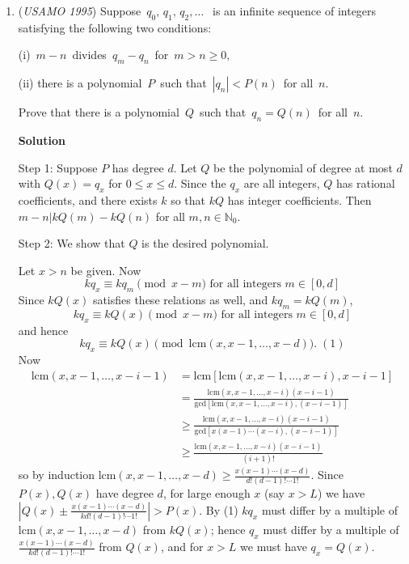 \begin{enumerate}
 $AA_1, BB_1, CC_1$ are medians, therefore $AA_2, BB_2, CC_2$ are symmedians, so the three symmedians meet at a point which is triangle center called the Lemoine point.

 \textbf{vladimir.shelomovskii@gmail.com, vvsss}

 


	\item (\textit{USAMO 1995}) Suppose $\, q_0, \, q_1, \,  q_2, \ldots \; \,$ is an infinite sequence of integers satisfying the following two conditions:

(i)  $\, m-n \,$ divides $\, q_m - q_n \,$ for $\, m > n \geq 0,$ 

(ii) there is a polynomial $\, P \,$ such that $\, |q_n| < P(n) \,$ for all $\, n$. 

Prove that there is a polynomial $\, Q \,$ such that $\, q_n = Q(n) \,$ for all $\, n$.


 



\textbf{Solution}

Step 1: Suppose $P$ has degree $d$. Let $Q$ be the polynomial of degree at most $d$ with $Q(x)=q_x$ for $0\leq x\leq d$. Since the $q_x$ are all integers, $Q$ has rational coefficients, and there exists $k$ so that $kQ$ has integer coefficients. Then $m-n|kQ(m)-kQ(n)$ for all $m,n\in \mathbb N_0$.

 Step 2: We show that $Q$ is the desired polynomial.

 Let $x>n$ be given. Now
 \[kq_x\equiv kq_m\pmod{x-m}\text{ for all integers }m\in[0,d]\]Since $kQ(x)$ satisfies these relations as well, and $kq_m=kQ(m)$,
 \[kq_x\equiv kQ(x)\pmod{x-m}\text{ for all integers }m\in[0,d]\]and hence
 \[kq_x\equiv kQ(x)\pmod{\text{lcm}(x,x-1,\ldots, x-d)}. \;(1)\]Now
 \begin{align*} \text{lcm}(x,x-1,\ldots, x-i-1)&=\text{lcm}[\text{lcm}(x,x-1,\ldots, x-i),x-i-1]\\ &=\frac{\text{lcm}(x,x-1,\ldots, x-i)(x-i-1)}{\text{gcd}[\text{lcm}(x,x-1,\ldots, x-i),(x-i-1)]}\\ &\geq \frac{\text{lcm}(x,x-1,\ldots, x-i)(x-i-1)}{\text{gcd}[x(x-1)\cdots(x-i),(x-i-1)]}\\ &\geq \frac{\text{lcm}(x,x-1,\ldots, x-i)(x-i-1)}{(i+1)!} \end{align*}
so by induction $\text{lcm}(x,x-1,\ldots, x-d)\geq \frac{x(x-1)\cdots (x-d)}{d!(d-1)!\cdots 1!}$. Since $P(x), Q(x)$ have degree $d$, for large enough $x$ (say $x>L$) we have $\left|Q(x)\pm\frac{x(x-1)\cdots (x-d)}{kd!(d-1)!\cdots 1!}\right|>P(x)$. By (1) $kq_x$ must differ by a multiple of $\text{lcm}(x,x-1,\ldots, x-d)$ from $kQ(x)$; hence $q_x$ must differ by a multiple of $\frac{x(x-1)\cdots (x-d)}{kd!(d-1)!\cdots 1!}$ from $Q(x)$, and for $x>L$ we must have $q_x=Q(x)$.


\end{enumerate}
